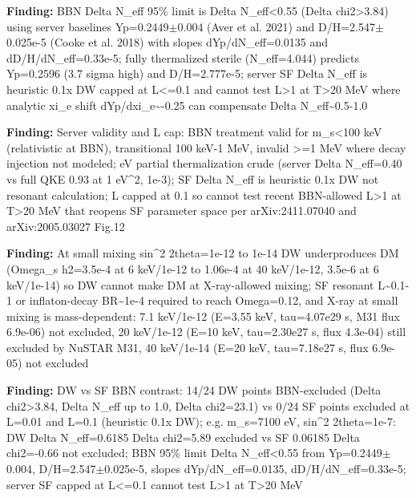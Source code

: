 \documentclass[11pt,a4paper]{article}
\begin{document}
\textbf{Finding:} BBN Delta N\_eff 95\% limit is Delta N\_eff\textless{}0.55 (Delta chi2\textgreater{}3.84) using server baselines Yp=0.2449$\pm$0.004 (Aver et al. 2021) and D/H=2.547$\pm$0.025e-5 (Cooke et al. 2018) with slopes dYp/dN\_eff=0.0135 and dD/H/dN\_eff=0.33e-5; fully thermalized sterile (N\_eff=4.044) predicts Yp=0.2596 (3.7 sigma high) and D/H=2.777e-5; server SF Delta N\_eff is heuristic 0.1x DW capped at L\textless{}=0.1 and cannot test L\textgreater{}1 at T\textgreater{}20 MeV where analytic xi\_e shift dYp/dxi\_e\textasciitilde{}-0.25 can compensate Delta N\_eff\textasciitilde{}0.5-1.0

\textbf{Finding:} Server validity and L cap: BBN treatment valid for m\_s\textless{}100 keV (relativistic at BBN), transitional 100 keV-1 MeV, invalid \textgreater{}=1 MeV where decay injection not modeled; eV partial thermalization crude (server Delta N\_eff=0.40 vs full QKE 0.93 at 1 eV\textasciicircum{}2, 1e-3); SF Delta N\_eff is heuristic 0.1x DW not resonant calculation; L capped at 0.1 so cannot test recent BBN-allowed L\textgreater{}1 at T\textgreater{}20 MeV that reopens SF parameter space per arXiv:2411.07040 and arXiv:2005.03027 Fig.12

\textbf{Finding:} At small mixing sin\textasciicircum{}2 2theta=1e-12 to 1e-14 DW underproduces DM (Omega\_s h2=3.5e-4 at 6 keV/1e-12 to 1.06e-4 at 40 keV/1e-12, 3.5e-6 at 6 keV/1e-14) so DW cannot make DM at X-ray-allowed mixing; SF resonant L\textasciitilde{}0.1-1 or inflaton-decay BR\textasciitilde{}1e-4 required to reach Omega=0.12, and X-ray at small mixing is mass-dependent: 7.1 keV/1e-12 (E=3.55 keV, tau=4.07e29 s, M31 flux 6.9e-06) not excluded, 20 keV/1e-12 (E=10 keV, tau=2.30e27 s, flux 4.3e-04) still excluded by NuSTAR M31, 40 keV/1e-14 (E=20 keV, tau=7.18e27 s, flux 6.9e-05) not excluded

\textbf{Finding:} DW vs SF BBN contrast: 14/24 DW points BBN-excluded (Delta chi2\textgreater{}3.84, Delta N\_eff up to 1.0, Delta chi2=23.1) vs 0/24 SF points excluded at L=0.01 and L=0.1 (heuristic 0.1x DW); e.g. m\_s=7100 eV, sin\textasciicircum{}2 2theta=1e-7: DW Delta N\_eff=0.6185 Delta chi2=5.89 excluded vs SF 0.06185 Delta chi2=-0.66 not excluded; BBN 95\% limit Delta N\_eff\textless{}0.55 from Yp=0.2449$\pm$0.004, D/H=2.547$\pm$0.025e-5, slopes dYp/dN\_eff=0.0135, dD/H/dN\_eff=0.33e-5; server SF capped at L\textless{}=0.1 cannot test L\textgreater{}1 at T\textgreater{}20 MeV
\end{document}
